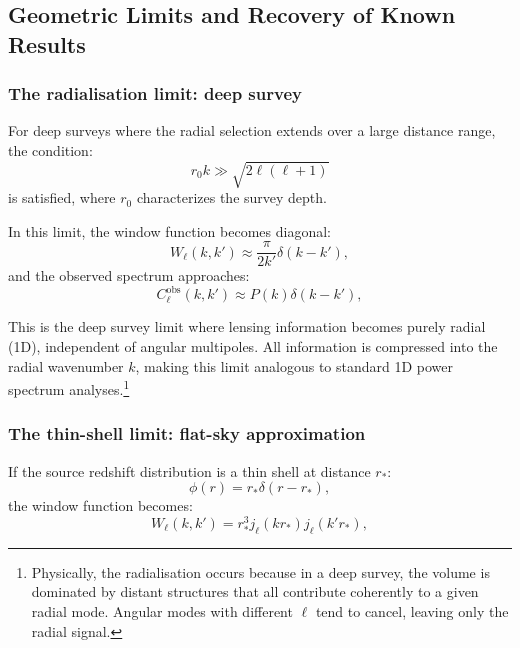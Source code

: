 \subsection{Geometric Limits and Recovery of Known Results}

\subsubsection{The radialisation limit: deep survey}

For deep surveys where the radial selection extends over a large distance range, the condition:
\begin{equation}
r_0 k \gg \sqrt{2\ell(\ell+1)}
\label{eq:radialisation_condition_wl}
\end{equation}
is satisfied, where $r_0$ characterizes the survey depth.

In this limit, the window function becomes diagonal:
\begin{equation}
W_\ell(k, k') \approx \frac{\pi}{2k'} \delta(k - k'),
\label{eq:window_radial_limit_wl}
\end{equation}
and the observed spectrum approaches:
\begin{equation}
C^{\text{obs}}_\ell(k, k') \approx P(k) \delta(k - k'),
\label{eq:spectrum_radial_limit_wl}
\end{equation}

This is the deep survey limit where lensing information becomes purely radial (1D), independent of angular multipoles.
All information is compressed into the radial wavenumber $k$, making this limit analogous to standard 1D power spectrum analyses.\footnote{Physically,
the radialisation occurs because in a deep survey, the volume is dominated by distant structures that all contribute coherently
to a given radial mode. Angular modes with different $\ell$ tend to cancel, leaving only the radial signal.}

\subsubsection{The thin-shell limit: flat-sky approximation}

If the source redshift distribution is a thin shell at distance $r_*$:
\begin{equation}
\phi(r) = r_* \delta(r - r_*),
\label{eq:thin_shell_selection_wl}
\end{equation}
the window function becomes:
\begin{equation}
W_\ell(k, k') = r_*^3 j_\ell(kr_*) j_\ell(k'r_*),
\label{eq:window_thin_shell_wl}
\end{equation}

